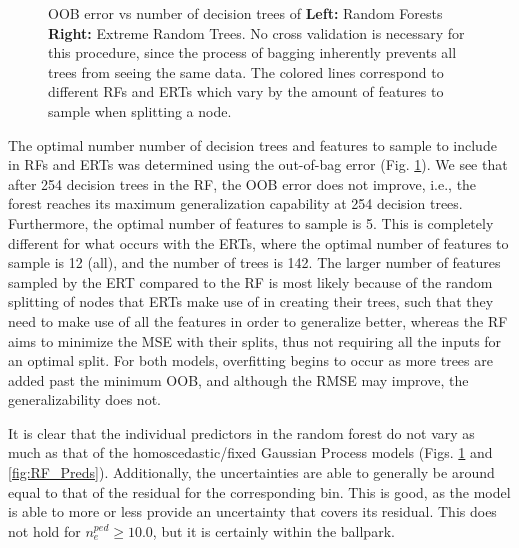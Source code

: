 \documentclass[a4paper, twoside, final, 12pt]{article}
\begin{document}
{\begin{figure}[h]
\begin{subfigure}{0.5\linewidth}
	\end{subfigure}
	\caption{OOB error vs number of decision trees of \textbf{Left:} Random Forests \textbf{Right:} Extreme Random Trees. No cross validation is necessary for this procedure, since the process of bagging inherently prevents all trees from seeing the same data. The colored lines correspond to different RFs and ERTs which vary by the amount of features to sample when splitting a node.}
	\label{fig:RF_exp}
\end{figure}
The optimal number number of decision trees and features to sample to include in RFs and ERTs was determined using the out-of-bag error (Fig. \ref{fig:RF_exp}). We see that after 254 decision trees in the RF, the OOB error does not improve, i.e., the forest reaches its maximum generalization capability at 254 decision trees. Furthermore, the optimal number of features to sample is 5. This is completely different for what occurs with the ERTs, where the optimal number of features to sample is 12 (all), and the number of trees is 142. The larger number of features sampled by the ERT compared to the RF is most likely because of the random splitting of nodes that ERTs make use of in creating their trees, such that they need to make use of all the features in order to generalize better, whereas the RF aims to minimize the MSE with their splits, thus not requiring all the inputs for an optimal split. For both models, overfitting begins to occur as more trees are added past the minimum OOB, and although the RMSE may improve, the generalizability does not.

It is clear that the individual predictors in the random forest do not vary as much as that of the homoscedastic/fixed Gaussian Process models (Figs. \ref{fig:RF_exp} and \ref{fig:RF_Preds}).
Additionally, the uncertainties are able to generally be around equal to that of the residual for the corresponding bin. This is good, as the model is able to more or less provide an uncertainty that covers its residual. This does not hold for $n_e^{ped} \geq 10.0$, but it is certainly within the ballpark. 

}
\end{document}
